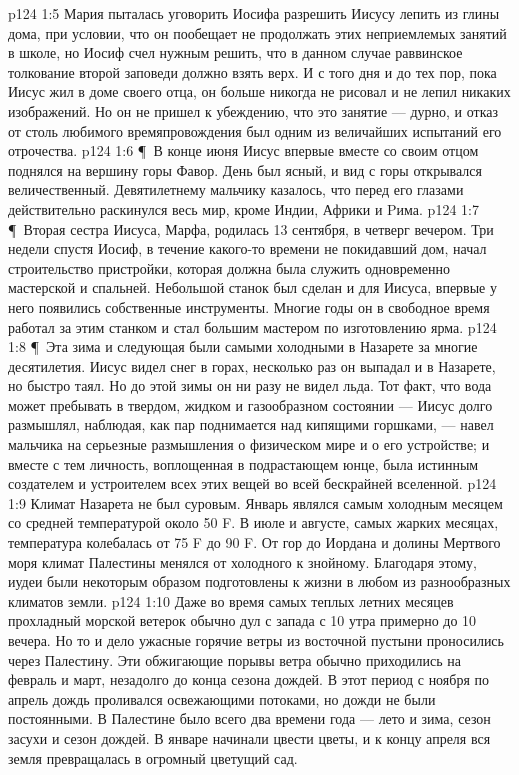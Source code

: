 \vs p124 1:5 Мария пыталась уговорить Иосифа разрешить Иисусу лепить из глины дома, при условии, что он пообещает не продолжать этих неприемлемых занятий в школе, но Иосиф счел нужным решить, что в данном случае раввинское толкование второй заповеди должно взять верх. И с того дня и до тех пор, пока Иисус жил в доме своего отца, он больше никогда не рисовал и не лепил никаких изображений. Но он не пришел к убеждению, что это занятие --- дурно, и отказ от столь любимого времяпровождения был одним из величайших испытаний его отрочества.
\vs p124 1:6 \P\ В конце июня Иисус впервые вместе со своим отцом поднялся на вершину горы Фавор. День был ясный, и вид с горы открывался величественный. Девятилетнему мальчику казалось, что перед его глазами действительно раскинулся весь мир, кроме Индии, Африки и Pима.
\vs p124 1:7 \P\ Вторая сестра Иисуса, Марфа, родилась 13 сентября, в четверг вечером. Три недели спустя Иосиф, в течение какого\hyp{}то времени не покидавший дом, начал строительство пристройки, которая должна была служить одновременно мастерской и спальней. Небольшой станок был сделан и для Иисуса, впервые у него появились собственные инструменты. Многие годы он в свободное время работал за этим станком и стал большим мастером по изготовлению ярма.
\vs p124 1:8 \P\ Эта зима и следующая были самыми холодными в Назарете за многие десятилетия. Иисус видел снег в горах, несколько раз он выпадал и в Назарете, но быстро таял. Но до этой зимы он ни разу не видел льда. Тот факт, что вода может пребывать в твердом, жидком и газообразном состоянии --- Иисус долго размышлял, наблюдая, как пар поднимается над кипящими горшками, --- навел мальчика на серьезные размышления о физическом мире и о его устройстве; и вместе с тем личность, воплощенная в подрастающем юнце, была истинным создателем и устроителем всех этих вещей во всей бескрайней вселенной.
\vs p124 1:9 Климат Назарета не был суровым. Январь являлся самым холодным месяцем со средней температурой около 50 F. В июле и августе, самых жарких месяцах, температура колебалась от 75 F до 90 F. От гор до Иордана и долины Мертвого моря климат Палестины менялся от холодного к знойному. Благодаря этому, иудеи были некоторым образом подготовлены к жизни в любом из разнообразных климатов земли.
\vs p124 1:10 Даже во время самых теплых летних месяцев прохладный морской ветерок обычно дул с запада с 10 утра примерно до 10 вечера. Но то и дело ужасные горячие ветры из восточной пустыни проносились через Палестину. Эти обжигающие порывы ветра обычно приходились на февраль и март, незадолго до конца сезона дождей. В этот период с ноября по апрель дождь проливался освежающими потоками, но дожди не были постоянными. В Палестине было всего два времени года --- лето и зима, сезон засухи и сезон дождей. В январе начинали цвести цветы, и к концу апреля вся земля превращалась в огромный цветущий сад.
